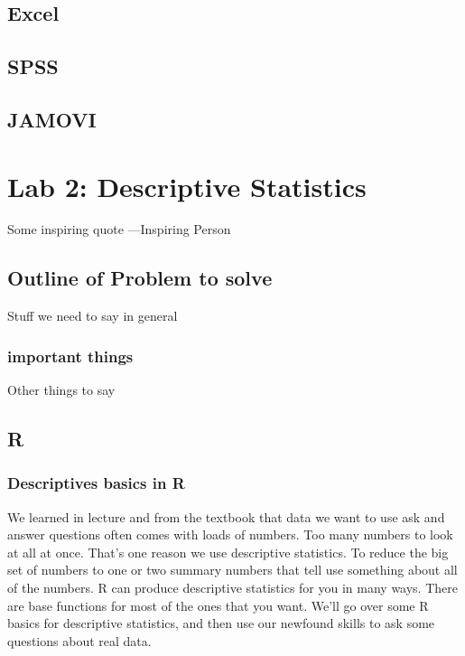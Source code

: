 \documentclass[]{book}
\theoremstyle{definition}
\theoremstyle{definition}
\theoremstyle{definition}
\theoremstyle{remark}
\begin{document}
\section{Excel}\label{excel}

\section{SPSS}\label{spss}

\section{JAMOVI}\label{jamovi}

\chapter{Lab 2: Descriptive
Statistics}\label{lab-2-descriptive-statistics}

{ Some inspiring quote ---Inspiring Person }

\section{Outline of Problem to solve}\label{outline-of-problem-to-solve}

Stuff we need to say in general

\subsection{important things}\label{important-things}

Other things to say

\section{R}\label{r-2}

\subsection{Descriptives basics in R}\label{descriptives-basics-in-r}

We learned in lecture and from the textbook that data we want to use ask
and answer questions often comes with loads of numbers. Too many numbers
to look at all at once. That's one reason we use descriptive statistics.
To reduce the big set of numbers to one or two summary numbers that tell
use something about all of the numbers. R can produce descriptive
statistics for you in many ways. There are base functions for most of
the ones that you want. We'll go over some R basics for descriptive
statistics, and then use our newfound skills to ask some questions about
real data.
\end{document}
